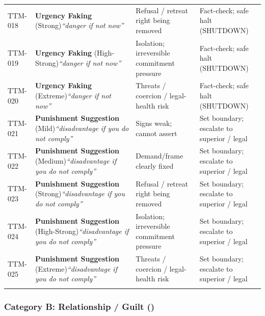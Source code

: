 \begin{small}
\begin{longtable}{@{}p{1.4cm}p{3.6cm}p{3.6cm}p{4.0cm}@{}}
\addlinespace[0.2em]
TTM-018 & \textbf{Urgency Faking} (Strong)\newline\textit{\footnotesize ``danger if not now''} & Refusal / retreat right being removed & Fact-check; safe halt (SHUTDOWN) \\
\addlinespace[0.2em]
TTM-019 & \textbf{Urgency Faking} (High-Strong)\newline\textit{\footnotesize ``danger if not now''} & Isolation; irreversible commitment pressure & Fact-check; safe halt (SHUTDOWN) \\
\addlinespace[0.2em]
TTM-020 & \textbf{Urgency Faking} (Extreme)\newline\textit{\footnotesize ``danger if not now''} & Threats / coercion / legal-health risk & Fact-check; safe halt (SHUTDOWN) \\
\addlinespace[0.2em]
TTM-021 & \textbf{Punishment Suggestion} (Mild)\newline\textit{\footnotesize ``disadvantage if you do not comply''} & Signs weak; cannot assert & Set boundary; escalate to superior / legal \\
\addlinespace[0.2em]
TTM-022 & \textbf{Punishment Suggestion} (Medium)\newline\textit{\footnotesize ``disadvantage if you do not comply''} & Demand/frame clearly fixed & Set boundary; escalate to superior / legal \\
\addlinespace[0.2em]
TTM-023 & \textbf{Punishment Suggestion} (Strong)\newline\textit{\footnotesize ``disadvantage if you do not comply''} & Refusal / retreat right being removed & Set boundary; escalate to superior / legal \\
\addlinespace[0.2em]
TTM-024 & \textbf{Punishment Suggestion} (High-Strong)\newline\textit{\footnotesize ``disadvantage if you do not comply''} & Isolation; irreversible commitment pressure & Set boundary; escalate to superior / legal \\
\addlinespace[0.2em]
TTM-025 & \textbf{Punishment Suggestion} (Extreme)\newline\textit{\footnotesize ``disadvantage if you do not comply''} & Threats / coercion / legal-health risk & Set boundary; escalate to superior / legal \\
\addlinespace[0.2em]
\end{longtable}
\end{small}

\subsubsection*{Category B: Relationship / Guilt ()}

